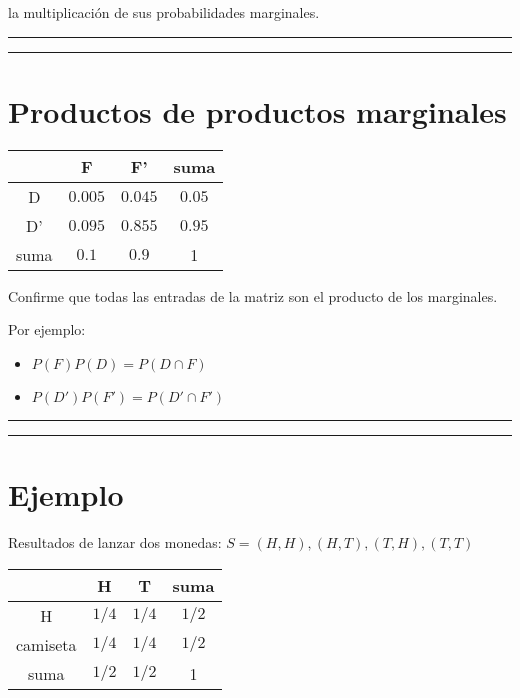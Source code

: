 \documentclass[
]{book}
\providecommand{\tightlist}{%
  \setlength{\itemsep}{0pt}\setlength{\parskip}{0pt}}
\begin{document}
la multiplicación de sus probabilidades marginales.

\begin{center}\rule{0.5\linewidth}{0.5pt}\end{center}

\begin{center}\rule{0.5\linewidth}{0.5pt}\end{center}

\hypertarget{productos-de-productos-marginales}{%
\section{Productos de productos marginales}\label{productos-de-productos-marginales}}

\begin{longtable}[]{@{}cccc@{}}
\toprule
& F & F' & suma \\
\midrule
\endhead
D & \(0.005\) & \(0.045\) & \(0.05\) \\
D' & \(0.095\) & \(0.855\) & \(0.95\) \\
suma & \(0.1\) & \(0.9\) & 1 \\
\bottomrule
\end{longtable}

Confirme que todas las entradas de la matriz son el producto de los marginales.

Por ejemplo:

\begin{itemize}
\tightlist
\item
  \(P(F)P(D)= P(D \cap F)\)
\item
  \(P(D')P(F')=P(D' \cap F')\)
\end{itemize}

\begin{center}\rule{0.5\linewidth}{0.5pt}\end{center}

\begin{center}\rule{0.5\linewidth}{0.5pt}\end{center}

\hypertarget{ejemplo-5}{%
\section{Ejemplo}\label{ejemplo-5}}

Resultados de lanzar dos monedas: \(S={(H,H), (H,T), (T,H), (T,T)}\)

\begin{longtable}[]{@{}cccc@{}}
\toprule
& H & T & suma \\
\midrule
\endhead
H & \(1/4\) & \(1/4\) & \(1/2\) \\
camiseta & \(1/4\) & \(1/4\) & \(1/2\) \\
suma & \(1/2\) & \(1/2\) & 1 \\
\bottomrule
\end{longtable}
\end{document}
